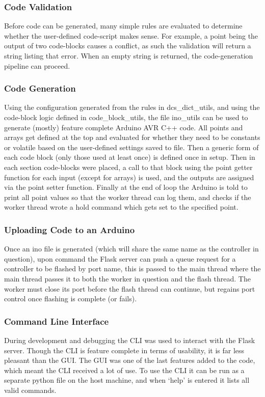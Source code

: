 \documentclass[../main.tex]{subfiles}
\begin{document}
\subsubsection{Code Validation} Before code can be generated, many simple rules are evaluated to determine whether the user-defined code-script makes sense. For example, a point being the output of two code-blocks causes a conflict, as such the validation will return a string listing that error. When an empty string is returned, the code-generation pipeline can proceed.

\subsubsection{Code Generation} Using the configuration generated from the rules in dcs\_dict\_utils, and using the code-block logic defined in code\_block\_utils, the file ino\_utils can be used to generate (mostly) feature complete Arduino AVR C++ code. All points and arrays get defined at the top and evaluated for whether they need to be constants or volatile based on the user-defined settings saved to file. Then a generic form of each code block (only those used at least once) is defined once in setup. Then in each section code-blocks were placed, a call to that block using the point getter function for each input (except for arrays) is used, and the outputs are assigned via the point setter function. Finally at the end of loop the Arduino is told to print all point values so that the worker thread can log them, and checks if the worker thread wrote a hold command which gets set to the specified point.

\subsubsection{Uploading Code to an Arduino} Once an ino file is generated (which will share the same name as the controller in question), upon command the Flask server can push a queue request for a controller to be flashed by port name, this is passed to the main thread where the main thread passes it to both the worker in question and the flash thread. The worker must close its port before the flash thread can continue, but regains port control once flashing is complete (or fails).

\subsubsection{Command Line Interface}
During development and debugging the CLI was used to interact with the Flask server. Though the CLI is feature complete in terms of usability, it is far less pleasant than the GUI. The GUI was one of the last features added to the code, which meant the CLI received a lot of use. To use the CLI it can be run as a separate python file on the host machine, and when `help' is entered it lists all valid commands.
\end{document}
